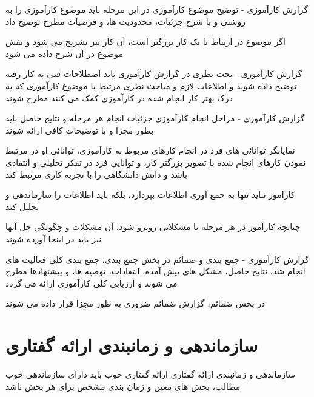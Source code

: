 \documentclass[14pt]{beamer}
\newcommand{\sectionfontsize}{\fontsize{22pt}{0pt}\selectfont}
\newcommand{\framefontsizelarge}{\fontsize{18pt}{0pt}\selectfont}
\newcommand{\frametitlefontsize}{\fontsize{20pt}{0pt}\selectfont}
\begin{document}
\begin{persian}
	\begin{frame}[plain]{\frametitlefontsize گزارش کارآموزی - توضیح موضوع کارآموزی}
		\framefontsizelarge
		در این مرحله باید موضوع کارآموزی را به روشنی و با شرح جزئیات، محدودیت ها، و فرضیات مطرح توضیح داد
		
		اگر موضوع در ارتباط با یک کار بزرگتر است، آن کار نیز تشریح می شود و نقش موضوع در آن شرح داده می شود
	\end{frame}	
	
	\begin{frame}[plain]{\frametitlefontsize گزارش کارآموزی - بحث نظری}
		\framefontsizelarge
		در گزارش کارآموزی باید اصطلاحات فنی به کار رفته توضیح داده شوند و اطلاعات لازم و مباحث نظری مرتبط با موضوع کارآموزی که به درک بهتر کار انجام شده در کارآموزی کمک می کنند مطرح شوند
	\end{frame}	
	
	\begin{frame}[plain]{\frametitlefontsize گزارش کارآموزی - مراحل انجام کارآموزی}
		\framefontsizelarge
		جزئیات انجام هر مرحله و نتایج حاصل باید بطور مجزا و با توضیحات کافی ارائه شوند
		
		نمایانگر توانائی های فرد در انجام کارهای مربوط به کارآموزی، توانائی او در مرتبط نمودن کارهای انجام شده با تصویر بزرگتر کار، و توانایی فرد در تفکر تحلیلی و انتقادی باشد و دانش دانشگاهی را با تجربه کاری مرتبط کند
		
		کارآموز نباید تنها به جمع آوری اطلاعات بپردازد، بلکه باید اطلاعات را سازماندهی و تحلیل کند
		
		چنانچه کارآموز در هر مرحله با مشکلاتی روبرو شود، آن مشکلات و چگونگی حل آنها نیز باید در اینجا آورده شوند
	\end{frame}	
	
	\begin{frame}[plain]{\frametitlefontsize گزارش کارآموزی - جمع بندی و ضمائم}
		\framefontsizelarge
		در بخش جمع بندی، جمع بندی کلی فعالیت های انجام شد، نتایج حاصل، مشکل های پیش آمده، انتقادات، توصیه ها، و پیشنهادها مطرح می شوند و ارزیابی کلی کارآموزی ارائه می گردد
		
		در بخش ضمائم، گزارش ضمائم ضروری به طور مجزا قرار داده می شوند
	\end{frame}	
	
	\section{\sectionfontsize سازماندهی و زمانبندی ارائه گفتاری}	
	
	\begin{frame}[plain]{\frametitlefontsize سازماندهی و زمانبندی ارائه گفتاری}
		\framefontsizelarge
		ارائه گفتاری خوب باید دارای سازماندهی خوب مطالب، بخش های معین و زمان بندی مشخص برای هر بخش باشد
		

\end{frame}
\end{persian}
\end{document}
